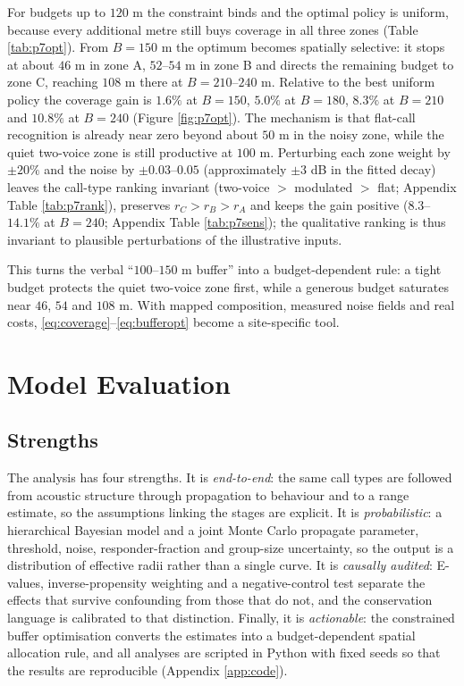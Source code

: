 \documentclass{apmcmthesis}
\begin{document}
For budgets up to $120$ m the constraint binds and the optimal policy is uniform, because every additional metre still buys coverage in all three zones (Table \ref{tab:p7opt}). From $B=150$ m the optimum becomes spatially selective: it stops at about $46$ m in zone A, $52$--$54$ m in zone B and directs the remaining budget to zone C, reaching $108$ m there at $B=210$--$240$ m. Relative to the best uniform policy the coverage gain is $1.6\%$ at $B=150$, $5.0\%$ at $B=180$, $8.3\%$ at $B=210$ and $10.8\%$ at $B=240$ (Figure \ref{fig:p7opt}). The mechanism is that flat-call recognition is already near zero beyond about $50$ m in the noisy zone, while the quiet two-voice zone is still productive at $100$ m. Perturbing each zone weight by $\pm20\%$ and the noise by $\pm0.03$--$0.05$ (approximately $\pm3$ dB in the fitted decay) leaves the call-type ranking invariant (two-voice $>$ modulated $>$ flat; Appendix Table \ref{tab:p7rank}), preserves $r_C>r_B>r_A$ and keeps the gain positive ($8.3$--$14.1\%$ at $B=240$; Appendix Table \ref{tab:p7sens}); the qualitative ranking is thus invariant to plausible perturbations of the illustrative inputs.

This turns the verbal ``$100$--$150$ m buffer'' into a budget-dependent rule: a tight budget protects the quiet two-voice zone first, while a generous budget saturates near $46$, $54$ and $108$ m. With mapped composition, measured noise fields and real costs, \eqref{eq:coverage}--\eqref{eq:bufferopt} become a site-specific tool.

\section{Model Evaluation}

\subsection{Strengths}

The analysis has four strengths. It is \emph{end-to-end}: the same call types are followed from acoustic structure through propagation to behaviour and to a range estimate, so the assumptions linking the stages are explicit. It is \emph{probabilistic}: a hierarchical Bayesian model and a joint Monte Carlo propagate parameter, threshold, noise, responder-fraction and group-size uncertainty, so the output is a distribution of effective radii rather than a single curve. It is \emph{causally audited}: E-values, inverse-propensity weighting and a negative-control test separate the effects that survive confounding from those that do not, and the conservation language is calibrated to that distinction. Finally, it is \emph{actionable}: the constrained buffer optimisation converts the estimates into a budget-dependent spatial allocation rule, and all analyses are scripted in Python with fixed seeds so that the results are reproducible (Appendix \ref{app:code}).
\end{document}
